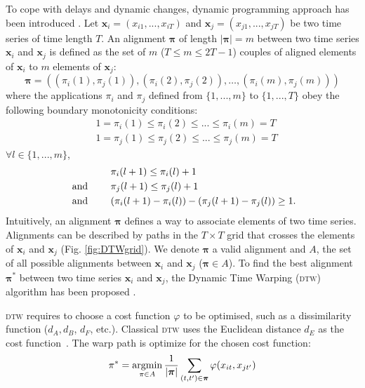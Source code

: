 To cope with delays and dynamic changes, dynamic programming approach has been introduced \cite{Berndt1994a}. Let $\textbf{x}_i=(x_{i1}, ..., x_{iT})$ and $\textbf{x}_j=(x_{j1}, ..., x_{jT})$ be two time series of time length $T$. An alignment $\boldsymbol{\pi}$ of length $|\boldsymbol{\pi}|=m$ between two time series $\textbf{x}_i$ and $\textbf{x}_j$ is defined as the set of $m$ ($T \leq m \leq 2T-1$) couples of aligned elements of $\textbf{x}_i$ to $m$ elements of $\textbf{x}_j$:
\begin{equation}
\boldsymbol{\pi} = 
\left(  
(\pi_i(1),\pi_j(1)), 
(\pi_i(2),\pi_j(2)), 
\ldots,
(\pi_i(m),\pi_j(m))
\right) 
\end{equation}
\noindent where the applications $\pi_i$ and $\pi_j$ defined from $\{1, ..., m\}$ to $\{1, ..., T\}$ obey the following boundary monotonicity conditions: 
\begin{align}
& 1 = \pi_i(1) \leq \pi_i(2) \leq ... \leq \pi_i(m) = T \\
& 1 = \pi_j(1) \leq \pi_j(2) \leq ... \leq \pi_j(m) = T 
\end{align}
$\forall l \in \{1, ..., m\}$, 
\begin{align}
& \pi_i(l+1) \leq \pi_i(l)+1 \\
\text{  and  \qquad} & \pi_j(l+1) \leq \pi_j(l)+1 \\
\text{  and  \qquad} & ( \pi_i(l+1)-\pi_i(l) ) - ( \pi_j(l+1)-\pi_j(l)) \geq 1 . 
\end{align}
Intuitively, an alignment $\boldsymbol{\pi}$ defines a way to associate elements of two time series. Alignments can be described by paths in the $T \times T$ grid that crosses the elements of $\textbf{x}_i$ and $\textbf{x}_j$ (Fig. \ref{fig:DTWgrid}). We denote $\boldsymbol{\pi}$ a valid alignment and $A$, the set of all possible alignments between $\textbf{x}_i$ and $\textbf{x}_j$ ($\boldsymbol{\pi} \in A$). To find the best alignment $\boldsymbol{\pi}^*$ between two time series $\textbf{x}_i$ and $\textbf{x}_j$, the Dynamic Time Warping (\textsc{dtw}) algorithm has been proposed \cite{Keogh2004,Salvador}.

\textsc{dtw} requires to choose a cost function $\varphi$ to be optimised, such as a dissimilarity function ($d_A, d_B$, $d_F$, etc.). Classical \textsc{dtw} uses the Euclidean distance $d_E$ as the cost function~\cite{Berndt1994}. The warp path is optimize for the chosen cost function:
\begin{equation*}
\pi^* = \argmin_{\pi \in A} \frac{1}{|\boldsymbol{\pi}|}
\sum_{(t,t') \in \boldsymbol{\pi}} \varphi(x_{it}, x_{jt'})
\label{eq:DTW}
\end{equation*}

